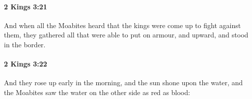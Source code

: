 		\paragraph{2 Kings 3:21} %
			\label{2KINGS-3-21}

			And when all the Moabites heard that the kings were come up to fight against them, they gathered all that were able to put on armour, and upward, and stood in the border.


		\paragraph{2 Kings 3:22} %
			\label{2KINGS-3-22}

			And they rose up early in the morning, and the sun shone upon the water, and the Moabites saw the water on the other side as red as blood:


